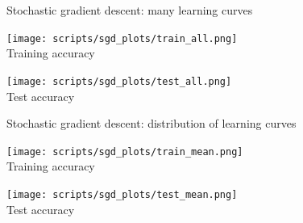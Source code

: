 \begin{frame}[c]{Stochastic gradient descent: many learning curves}


\begin{multicols}{2}
\begin{center}
\texttt{[image: scripts/sgd\_plots/train\_all.png]}\\
Training accuracy
\end{center}
\columnbreak
\begin{center}
\texttt{[image: scripts/sgd\_plots/test\_all.png]}\\
Test accuracy
\end{center}
\end{multicols}

  
\end{frame}


\begin{frame}[c]{Stochastic gradient descent: distribution of learning curves}


\begin{multicols}{2}
\begin{center}
\texttt{[image: scripts/sgd\_plots/train\_mean.png]}\\
Training accuracy
\end{center}
\columnbreak
\begin{center}
\texttt{[image: scripts/sgd\_plots/test\_mean.png]}\\
Test accuracy
\end{center}
\end{multicols}

  
\end{frame}


